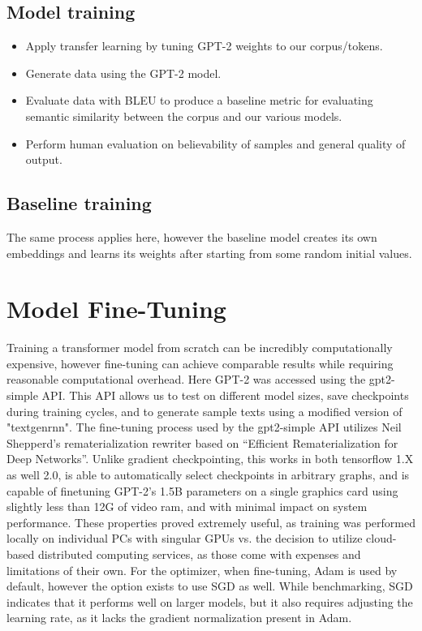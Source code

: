 \documentclass[11pt]{article}
\begin{document}
\subsection{Model training}

\begin{itemize}

\item Apply transfer learning by tuning GPT-2 weights to our corpus/tokens.
\item Generate data using the GPT-2 model.
\item Evaluate data with BLEU to produce a baseline metric for evaluating semantic similarity between the corpus and our various models.
\item Perform human evaluation on believability of samples and general quality of output.

\end{itemize}

\subsection{Baseline training}

The same process applies here, however the baseline model creates its own embeddings and learns its weights after starting from some random initial values.

\section{Model Fine-Tuning}

Training a transformer model from scratch can be incredibly computationally expensive, however fine-tuning can achieve comparable results while requiring reasonable computational overhead. Here GPT-2 was accessed using the gpt2-simple API. This API allows us to test on different model sizes, save checkpoints during training cycles, and to generate sample texts using a modified version of "textgenrnn". The fine-tuning process used by the gpt2-simple API utilizes Neil Shepperd's rematerialization rewriter based on “Efficient Rematerialization for Deep Networks”\cite{shepperd_wang_vee_svitkina_purohit_kumar_2019}. Unlike gradient checkpointing, this works in both tensorflow 1.X as well 2.0, is able to automatically select checkpoints in arbitrary graphs, and is capable of finetuning GPT-2's 1.5B parameters on a single graphics card using slightly less than 12G of video ram, and with minimal impact on system performance. These properties proved extremely useful, as training was performed locally on individual PCs with singular GPUs vs. the decision to utilize cloud-based distributed computing services, as those come with expenses and limitations of their own. For the optimizer, when fine-tuning, Adam is used by default, however the option exists to use SGD as well. While benchmarking, SGD indicates that it performs well on larger models, but it also requires adjusting the learning rate, as it lacks the gradient normalization present in Adam.
\end{document}
